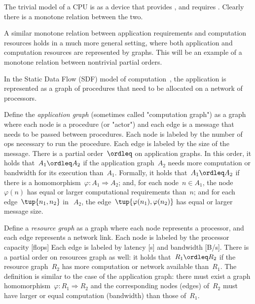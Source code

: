 The trivial model of a CPU is as a device that provides , and requires . Clearly there
is a monotone relation between the two.

\begin{figure}[h]
    \begin{center}
    \end{center}
    \caption{}
\end{figure}

A similar monotone relation between application requirements and computation
resources holds in a much more general setting, where both application
and computation resources are represented by graphs. This will be
an example of a monotone relation between nontrivial partial orders.

In the Static Data Flow (SDF) model of computation~\cite[Chapter 3]{sriram00,lee10},
the application is represented as a graph of procedures that need
to be allocated on a network of processors.

\begin{figure}[h]
    \begin{center}
    \end{center}
    \caption{}
\end{figure}


Define the\emph{ application graph }(sometimes called "computation
graph") as a graph where each node is a procedure (or "actor")
and each edge is a message that needs to be passed between procedures.
Each node is labeled by the number of ops necessary to run the procedure.
Each edge is labeled by the size of the message. There is a partial
order~$\ordleq$ on application graphs. In this order, it holds that~$A_1 \ordleq A_2$
if the application graph~$A_2$ needs more computation or bandwidth
for its execution than~$A_1$. Formally, it holds that~$A_1 \ordleq A_2$
if there is a homomorphism~$\varphi \colon A_1  \Rightarrow A_2$; and,
for each node~$n \in A_1$, the node~$\varphi(n)$ has equal or
larger computational requirements than~$n$; and for each edge~$\tup{n_1,n_2}$
in~$~A_2$, the edge~$\tup{\varphi (n_1), \varphi (n_2)}$ has equal or larger message size.


Define a \emph{resource graph} as a graph where each node represents
a processor, and each edge represents a network link. Each node is
labeled by the processor capacity [flops] Each edge is labeled
by latency [s] and bandwidth [B/s]. There is a partial order
on resources graph as well: it holds that~$R_1 \ordleq R_2$ if
the resource graph~$R_2$ has more computation or network available
than~$R_1$. The definition is similar to the case of the application
graph: there must exist a graph homomorphism~$\varphi \colon R_1  \Rightarrow R_2$
and the corresponding nodes (edges) of~$R_2$ must have larger
or equal computation (bandwidth) than those of~$R_1$.

